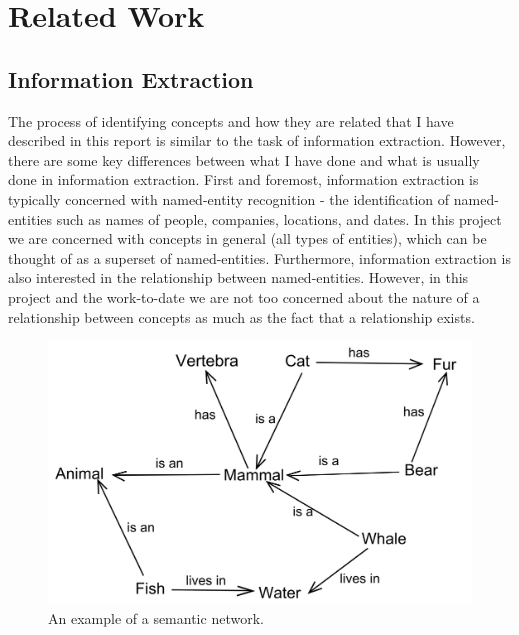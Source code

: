 \documentclass[12pt]{article}
\theoremstyle{grammarstyle}
\begin{document}
\section{Related Work} \label{sec:related_work}
\subsection{Information Extraction}
The process of identifying concepts and how they are related that I have described in this report is similar to the task of information extraction. However, there are some key differences between what I have done and what is usually done in information extraction. First and foremost, information extraction is typically concerned with named-entity recognition - the identification of named-entities such as names of people, companies, locations, and dates. In this project we are concerned with concepts in general (all types of entities), which can be thought of as a superset of named-entities. Furthermore, information extraction is also interested in the relationship between named-entities. However, in this project and the work-to-date we are not too concerned about the nature of a relationship between concepts as much as the fact that a relationship exists.

\begin{figure}
    \centering
    \includegraphics[width=\linewidth]{reports/technical_report/latex/figures/semantic_map_example.png}
    \caption{An example of a semantic network.\protect\footnotemark}
    \label{fig:semantic_network_example}
\end{figure}

\end{document}
